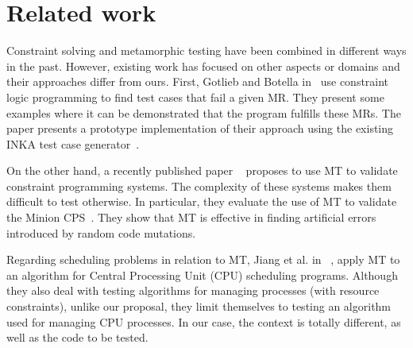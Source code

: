 \section{Related work}\label{sec2}


Constraint solving and metamorphic testing have been combined in different ways in the past. However, existing work has focused on other aspects or domains and their approaches differ from ours. First, Gotlieb and Botella in~\cite{DBLP:conf/compsac/GotliebB03} use constraint logic programming to find test cases that fail a given MR. They present some examples where it can be demonstrated that the program fulfills these MRs. The paper presents a prototype implementation of their approach using the existing INKA test case generator~\cite{ingenierie2002thales}.

On the other hand, a recently published paper ~\cite{akgun2018metamorphic} proposes to use MT to validate constraint programming systems. The complexity of these systems makes them difficult to test otherwise. In particular, they evaluate the use of MT to validate the Minion CPS~\cite{gent2006minion}. They show that MT is effective in finding artificial errors introduced by random code mutations.

Regarding scheduling problems in relation to MT, Jiang et al. in ~\cite{Jiang13MT}, apply MT to an algorithm for Central Processing Unit (CPU) scheduling programs. Although they also deal with testing algorithms for managing processes (with resource constraints), unlike our proposal, they limit themselves to testing an algorithm used for managing CPU processes. In our case, the context is totally different, as well as the code to be tested.





